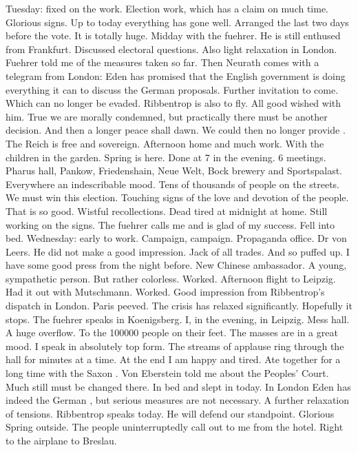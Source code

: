 Tuesday: fixed on the work. Election work, which has a claim on much time. Glorious signs. Up to today everything has gone well. Arranged the last two days before the vote. It is totally huge. Midday with the fuehrer. He is still enthused from Frankfurt. Discussed electoral questions. Also light relaxation in London. Fuehrer told me of the measures taken so far. Then Neurath comes with a telegram from London: Eden has promised that the English government is doing everything it can to discuss the German proposals. Further invitation to come. Which can no longer be evaded. Ribbentrop is also to fly. All good wished with him. True we are morally condemned, but practically there must be another decision. And then a longer peace shall dawn. We could then no longer provide . The Reich is free and sovereign. 
Afternoon home and much work. With the children in the garden. Spring is here. Done at 7 in the evening. 6 meetings. Pharus hall, Pankow, Friedenshain, Neue Welt, Bock brewery and Sportspalast. Everywhere an indescribable mood. Tens of thousands of people on the streets. We must win this election. Touching signs of the love and devotion of the people. That is so good. Wistful recollections. Dead tired at midnight at home. Still working on the signs. The fuehrer calls me and is glad of my success. Fell into bed.
Wednesday: early to work. Campaign, campaign. Propaganda office.  Dr von Leers. He did not make a good impression. Jack of all trades. And so puffed up. I have some good press from the night before. New Chinese ambassador. A young, sympathetic person. But rather colorless. Worked. Afternoon flight to Leipzig. Had it out with Mutschmann. Worked. Good impression from Ribbentrop's dispatch in London. Paris peeved. The crisis has relaxed significantly. Hopefully it stops. 
The fuehrer speaks in Koenigsberg. I, in the evening, in Leipzig. Mess hall. A huge overflow. To the 100000 people on their feet. The masses are in a great mood. I speak in absolutely top form. The streams of applause ring through the hall for minutes at a time. At the end I am happy and tired. Ate together for a long time with the Saxon . Von Eberstein told me about the Peoples' Court. Much still must be changed there. In bed and slept in today. In London Eden has indeed  the German , but serious measures are not necessary. A further relaxation of tensions. Ribbentrop speaks today. He will defend our standpoint. Glorious Spring outside. The people uninterruptedly call out to me from the hotel. Right to the airplane to Breslau.